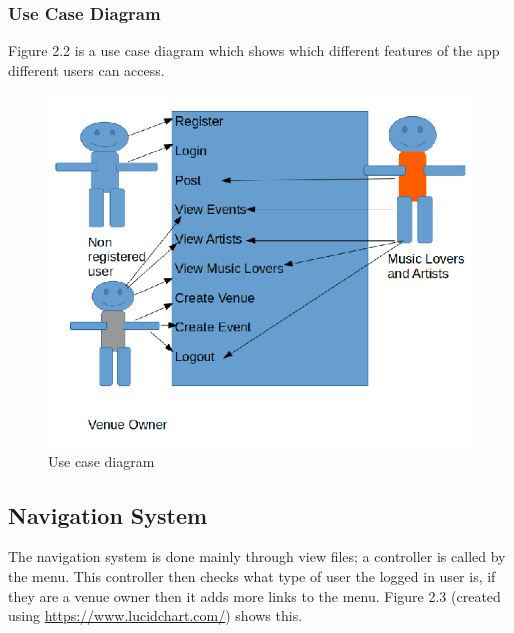 \subsubsection{Use Case Diagram}
Figure 2.2 is a use case diagram which shows which different features of the app different users can access.

\begin{figure}[H]
\includegraphics[width=\textwidth,height=\textheight,keepaspectratio]{images/usecase}
\caption{Use case diagram}
\end{figure}



\subsection{Navigation System}
The navigation system is done mainly through view files; a controller is called by the menu. This controller then checks what type of user the logged in user is, if they are a venue owner then it adds more links to the menu. Figure 2.3 (created using \url{https://www.lucidchart.com/}) shows this.

